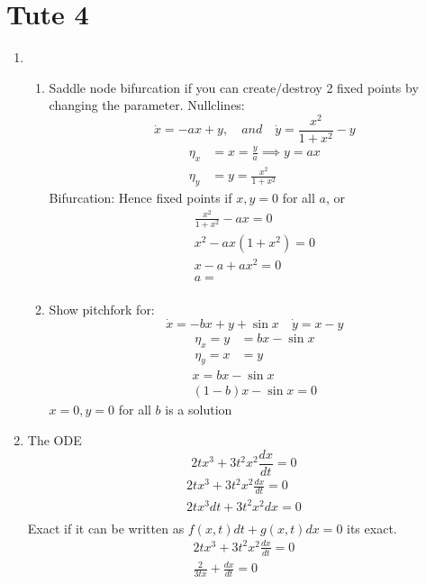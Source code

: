 \documentclass{/home/janmebows/Documents/LatexTemplates/myassignment}
\begin{document}
\clearpage
\section{Tute 4}
\begin{enumerate}
    \item 
    \begin{enumerate}
        \item Saddle node bifurcation if you can create/destroy 2 fixed points by changing the parameter. Nullclines:
        \[\dot{x} = -ax + y,\quad and \quad \dot{y} = \frac{x^2}{1+x^2} - y\]
        \begin{align*}
            \eta_x &= x =\frac{y}a \implies y = ax \\
            \eta_y &= y = \frac{x^2}{1+x^2}
        \end{align*}
        Bifurcation:
        Hence fixed points if $x,y=0$ for all $a$, or 
        \begin{align*}            
        \frac{x^2}{1+x^2} - ax= 0\\
        x^2 - ax(1+x^2) = 0\\
        x - a + ax^2 = 0\\
        a = \frac{}{}
        \end{align*}
        \item Show pitchfork for:
        \[\dot x  =-bx + y + \sin x \quad \dot y = x-y\]
        \begin{align*}
           \eta_x = y &= bx-\sin x\\
           \eta_y = x&=y
        \end{align*}
        \begin{align*}
            x = bx - \sin x\\
            (1-b)x - \sin x = 0
        \end{align*}
        $x=0,y=0$ for all $b$ is a solution
    \end{enumerate}
    \item The ODE
    \[2tx^3 + 3t^2x^2 \frac{dx}{dt} = 0\]
    \begin{align*}
        2tx^3 + 3t^2x^2 \frac{dx}{dt} = 0\\
        2tx^3dt + 3t^2x^2 dx= 0\\
    \end{align*}
    Exact if it can be written as $f(x,t)dt + g(x,t)dx = 0$ its exact.
    \begin{align*}
        2tx^3 + 3t^2x^2 \frac{dx}{dt} = 0\\
        \frac{2}{3tx} + \frac{dx}{dt} = 0\\

\end{align*}
\end{enumerate}
\end{document}
